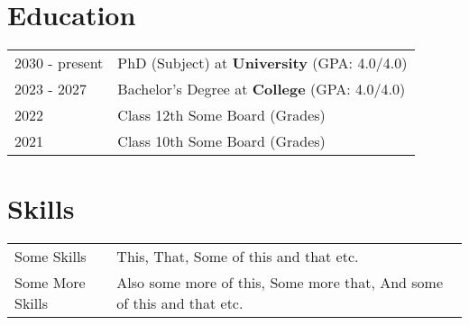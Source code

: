 \documentclass[a4paper,12pt]{article}
\begin{document}
\section{Education}
\begin{tabularx}{\linewidth}{@{}l X@{}}	
2030 - present & PhD (Subject) at \textbf{University} \hfill \normalsize (GPA: 4.0/4.0) \\

2023 - 2027 & Bachelor's Degree at \textbf{College} \hfill (GPA: 4.0/4.0) \\ 

2022 & Class 12th Some Board \hfill  (Grades) \\

2021 & Class 10th Some Board \hfill  (Grades) \\
\end{tabularx}


\section{Skills}
\begin{tabularx}{\linewidth}{@{}l X@{}}
Some Skills &  \normalsize{This, That, Some of this and that etc.}\\
Some More Skills  &  \normalsize{Also some more of this, Some more that, And some of this and that etc.}\\  
\end{tabularx}

\vfill
{}
\end{document}
